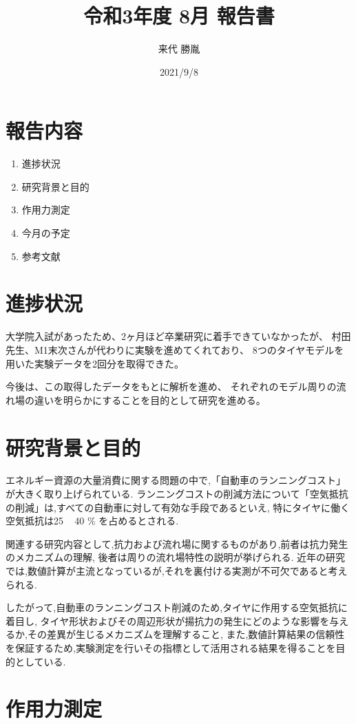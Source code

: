 \documentclass[twocolumn,a4j]{jsarticle}
\author{来代 勝胤}
\title{令和3年度 8月 報告書}
\date{2021/9/8}
\begin{document}
\columnseprule=0.1mm

\maketitle
\section*{報告内容}
\begin{enumerate}[1.]
    \item 進捗状況
    \item 研究背景と目的
    \item 作用力測定
    \item 今月の予定
    \item 参考文献
\end{enumerate}
\section{進捗状況}
大学院入試があったため、2ヶ月ほど卒業研究に着手できていなかったが、
村田先生、M1末次さんが代わりに実験を進めてくれており、
8つのタイヤモデルを用いた実験データを2回分を取得できた。\par
今後は、この取得したデータをもとに解析を進め、
それぞれのモデル周りの流れ場の違いを明らかにすることを目的として研究を進める。
\section{研究背景と目的}
エネルギー資源の大量消費に関する問題の中で,「自動車のランニングコスト」が大きく取り上げられている.
ランニングコストの削減方法について「空気抵抗の削減」は,すべての自動車に対して有効な手段であるといえ,
特にタイヤに働く空気抵抗は25 ~ 40 \% を占めるとされる. \par
関連する研究内容として,抗力および流れ場に関するものがあり,前者は抗力発生のメカニズムの理解,
後者は周りの流れ場特性の説明が挙げられる.
近年の研究では,数値計算が主流となっているが,それを裏付ける実測が不可欠であると考えられる.\par 
したがって,自動車のランニングコスト削減のため,タイヤに作用する空気抵抗に着目し,
タイヤ形状およびその周辺形状が揚抗力の発生にどのような影響を与えるか,その差異が生じるメカニズムを理解すること,
また,数値計算結果の信頼性を保証するため,実験測定を行いその指標として活用される結果を得ることを目的としている. 
\section{作用力測定}
\end{document}
